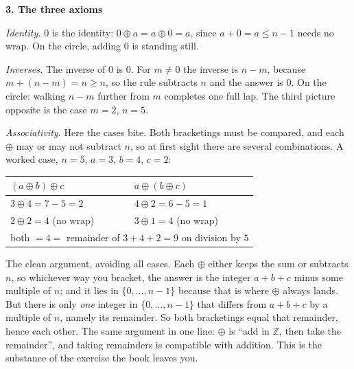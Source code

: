 \documentclass[10pt]{article}
\newcommand{\Z}{\mathbb{Z}}
\begin{document}
{\begin{minipage}[t]{744pt}
\begin{minipage}[t]{366pt}
\begin{pitfall}
\end{pitfall}
\end{minipage}\hfill
\begin{minipage}[t]{362pt}\vspace{0pt}
{\sffamily\bfseries\color{big} 3. The three axioms}\par\vspace{2pt}
\emph{Identity.} $0$ is the identity: $0\oplus a=a\oplus0=a$, since $a+0=a\le n-1$ needs no wrap. On the circle, adding $0$ is standing still.\par\vspace{2pt}
\emph{Inverses.} The inverse of $0$ is $0$. For $m\neq0$ the inverse is $n-m$, because $m+(n-m)=n\ge n$, so the rule subtracts $n$ and the answer is $0$. On the circle: walking $n-m$ further from $m$ completes one full lap. The third picture opposite is the case $m=2$, $n=5$.\par\vspace{2pt}
\emph{Associativity.} Here the cases bite. Both bracketings must be compared, and each $\oplus$ may or may not subtract $n$, so at first sight there are several combinations. A worked case, $n=5$, $a=3$, $b=4$, $c=2$:\par\vspace{2pt}
\centering
\begin{tabular}{@{}ll@{}}
\toprule
$(a\oplus b)\oplus c$ & $a\oplus(b\oplus c)$\\
\midrule
$3\oplus4=7-5=2$ & $4\oplus2=6-5=1$\\
$2\oplus2=4$ (no wrap) & $3\oplus1=4$ (no wrap)\\
\midrule
\multicolumn{2}{c}{both $=4=$ remainder of $3+4+2=9$ on division by $5$}\\
\bottomrule
\end{tabular}\par\vspace{3pt}
\raggedright
\begin{why}
The clean argument, avoiding all cases. Each $\oplus$ either keeps the sum or subtracts $n$, so whichever way you bracket, the answer is the integer $a+b+c$ minus some multiple of $n$; and it lies in $\{0,\dots,n-1\}$ because that is where $\oplus$ always lands. But there is only \emph{one} integer in $\{0,\dots,n-1\}$ that differs from $a+b+c$ by a multiple of $n$, namely its remainder. So both bracketings equal that remainder, hence each other. The same argument in one line: $\oplus$ is ``add in $\Z$, then take the remainder'', and taking remainders is compatible with addition. This is the substance of the exercise the book leaves you.

\end{why}
\end{minipage}
\end{minipage}}
\end{document}
